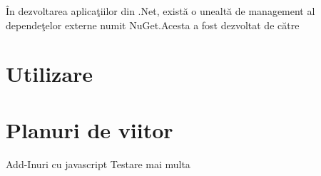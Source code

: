 \documentclass[a4paper,12pt]{report}
\begin{document}
\^In dezvoltarea aplica\c tiilor din .Net, exist\u a o unealt\u a de management al depende\c telor externe numit NuGet.Acesta 
a fost dezvoltat de c\u atre 

\chapter{Utilizare}



\chapter{Planuri de viitor}

Add-Inuri cu javascript
Testare mai multa

\printbibliography
\end{document}
